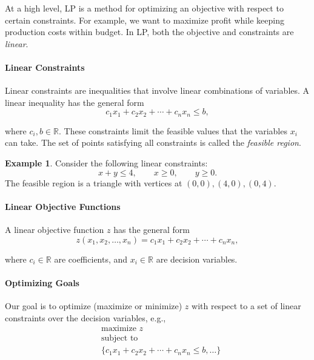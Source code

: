 \documentclass[oneside,11pt,dvipsnames]{book}
\numberwithin{equation}{section}
\theoremstyle{definition}
\newtheorem{example}{Example}[section]
\theoremstyle{remark}
\begin{document}
At a high level, LP is a method for optimizing an objective with respect to certain constraints. For example, we want to maximize profit while keeping production costs within budget. In LP, both the objective and constraints are \emph{linear}.


\paragraph{Linear Constraints}

Linear constraints are inequalities that involve linear combinations of variables.  A linear inequality has the general form
\[
c_1x_1 + c_2x_2 + \cdots + c_nx_n \leq b,
\]

where $c_i, b \in \mathbb{R}$. These constraints limit the feasible values that the variables $x_i$ can take.
The set of points satisfying all constraints is called the \emph{feasible region}.


\begin{example}\label{ex:lp-constraints}
Consider the following linear constraints:
\[
x + y \leq 4, \qquad x \geq 0, \qquad y \geq 0.
\]
The feasible region is a triangle with vertices at $(0,0), (4,0), (0,4)$.

\begin{center}
\end{center}
\end{example}

\paragraph{Linear Objective Functions}
A linear objective function $z$ has the general form
\[
z(x_1, x_2, \ldots, x_n) = c_1x_1 + c_2x_2 + \cdots + c_nx_n,
\]

where $c_i \in \mathbb{R}$ are coefficients, and $x_i \in \mathbb{R}$ are decision variables.


\paragraph{Optimizing Goals}
Our goal is to optimize (maximize or minimize) $z$ with respect to a set of linear constraints over the decision variables, e.g., 
\[
\begin{aligned}
& \text{maximize } z \\
& \text{subject to } \\
& \{c_1x_1 + c_2x_2 + \cdots + c_nx_n \leq b, \ldots    \}
\end{aligned}
\]
\end{document}
